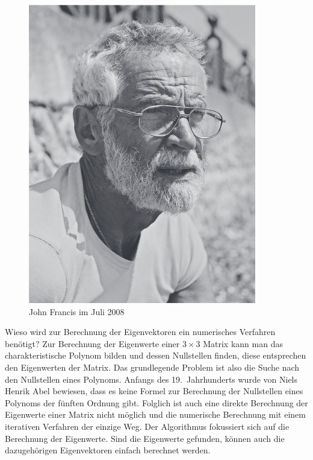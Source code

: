 \begin{refsection}
\begin{figure}[h]
	\begin{center}
		\includegraphics[scale=0.5]{papers/francis/images/Francis.png}
		\caption{John Francis im Juli 2008 \cite{francis:francis_portrait}}
		\label{John Francis}
	\end{center}
\end{figure}


Wieso wird zur Berechnung der Eigenvektoren ein numerisches Verfahren benötigt?
Zur Berechnung der Eigenwerte einer $3 \times 3$ Matrix kann man das charakteristische Polynom bilden und dessen Nullstellen finden, diese entsprechen den Eigenwerten der Matrix.
%
Das grundlegende Problem ist also die Suche nach den Nullstellen eines Polynoms.
Anfangs des 19.~Jahrhunderts wurde von Niels Henrik Abel bewiesen, dass es keine Formel zur Berechnung der Nullstellen eines Polynoms der fünften Ordnung gibt.
%
Folglich ist auch eine direkte Berechnung der Eigenwerte einer Matrix nicht möglich und die numerische Berechnung mit einem iterativen Verfahren der einzige Weg.
Der Algorithmus fokussiert sich auf die Berechnung der Eigenwerte.
Sind die Eigenwerte gefunden, können auch die dazugehörigen Eigenvektoren einfach berechnet werden.







\printbibliography[heading=subbibliography]
\end{refsection}
